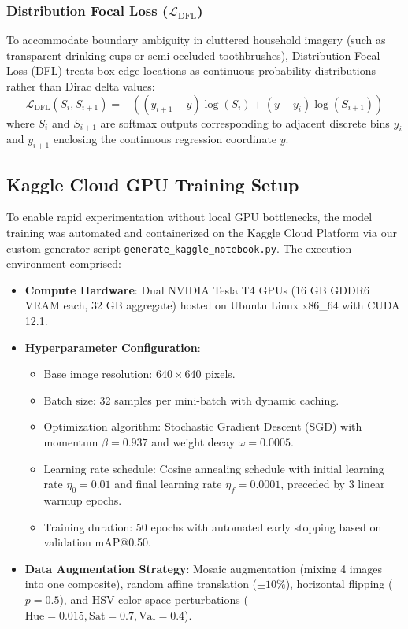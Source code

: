 \subsubsection{Distribution Focal Loss ($\mathcal{L}_{\text{DFL}}$)}
To accommodate boundary ambiguity in cluttered household imagery (such as transparent drinking cups or semi-occluded toothbrushes), Distribution Focal Loss (DFL) \cite{li2020generalized} treats box edge locations as continuous probability distributions rather than Dirac delta values:
\begin{equation}
    \mathcal{L}_{\text{DFL}}(S_i, S_{i+1}) = - \left( (y_{i+1} - y) \log(S_i) + (y - y_i) \log(S_{i+1}) \right)
    \label{eq:dfl}
\end{equation}
where $S_i$ and $S_{i+1}$ are softmax outputs corresponding to adjacent discrete bins $y_i$ and $y_{i+1}$ enclosing the continuous regression coordinate $y$.

\subsection{Kaggle Cloud GPU Training Setup}
To enable rapid experimentation without local GPU bottlenecks, the model training was automated and containerized on the Kaggle Cloud Platform via our custom generator script \texttt{generate\_kaggle\_notebook.py}. The execution environment comprised:
\begin{itemize}
    \item \textbf{Compute Hardware}: Dual NVIDIA Tesla T4 GPUs (16 GB GDDR6 VRAM each, 32 GB aggregate) hosted on Ubuntu Linux x86\_64 with CUDA 12.1.
    \item \textbf{Hyperparameter Configuration}:
    \begin{itemize}
        \item Base image resolution: $640 \times 640$ pixels.
        \item Batch size: 32 samples per mini-batch with dynamic caching.
        \item Optimization algorithm: Stochastic Gradient Descent (SGD) with momentum $\beta = 0.937$ and weight decay $\omega = 0.0005$.
        \item Learning rate schedule: Cosine annealing schedule with initial learning rate $\eta_0 = 0.01$ and final learning rate $\eta_f = 0.0001$, preceded by 3 linear warmup epochs.
        \item Training duration: 50 epochs with automated early stopping based on validation mAP@0.50.
    \end{itemize}
    \item \textbf{Data Augmentation Strategy}: Mosaic augmentation (mixing 4 images into one composite), random affine translation ($\pm 10\%$), horizontal flipping ($p=0.5$), and HSV color-space perturbations ($\text{Hue}=0.015, \text{Sat}=0.7, \text{Val}=0.4$).
\end{itemize}

